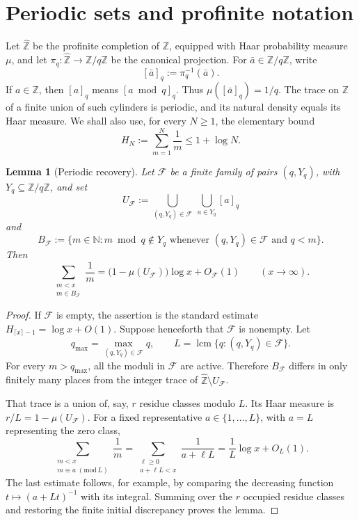 \documentclass[11pt]{article}
\numberwithin{equation}{section}
\newtheorem{lemma}[theorem]{Lemma}
\theoremstyle{definition}
\theoremstyle{remark}
\newcommand{\N}{\mathbb N}
\newcommand{\Z}{\mathbb Z}
\newcommand{\Zh}{\widehat{\mathbb Z}}
\begin{document}
\section{Periodic sets and profinite notation}\label{sec:periodic}
Let \(\Zh\) be the profinite completion of \(\Z\), equipped with Haar
probability measure \(\mu\), and let
\(\pi_q:\Zh\to\Z/q\Z\) be the canonical projection.  For
\(\bar a\in\Z/q\Z\), write
\[
 [\bar a]_q:=\pi_q^{-1}(\bar a).
\]
If \(a\in\Z\), then \([a]_q\) means \([a\bmod q]_q\).  Thus
\(\mu([\bar a]_q)=1/q\).  The trace on \(\Z\) of a finite union of such
cylinders is periodic, and its natural density equals its Haar measure.
We shall also use, for every \(N\ge1\), the elementary bound
\[
 H_N:=\sum_{m=1}^N\frac1m\le1+\log N.
\]

\begin{lemma}[Periodic recovery]\label{lem:periodic}
Let \(\mathcal F\) be a finite family of pairs \((q,Y_q)\), with
\(Y_q\subseteq\Z/q\Z\), and set
\[
 U_{\mathcal F}
 :=\bigcup_{(q,Y_q)\in\mathcal F}\ \bigcup_{a\in Y_q}[a]_q
\]
and
\[
 B_{\mathcal F}
 :=\{m\in\N:m\bmod q\notin Y_q
       \text{ whenever }(q,Y_q)\in\mathcal F\text{ and }q<m\}.
\]
Then
\[
 \sum_{\substack{m<x\\m\in B_{\mathcal F}}}\frac1m
 =\bigl(1-\mu(U_{\mathcal F})\bigr)\log x+O_{\mathcal F}(1)
 \qquad(x\to\infty).
\]
\end{lemma}

\begin{proof}
If \(\mathcal F\) is empty, the assertion is the standard estimate
\(H_{\lceil x\rceil-1}=\log x+O(1)\).  Suppose henceforth that
\(\mathcal F\) is nonempty.  Let
\[
 q_{\max}=\max_{(q,Y_q)\in\mathcal F}q,
 \qquad
 L=\operatorname{lcm}\{q:(q,Y_q)\in\mathcal F\}.
\]
For every \(m>q_{\max}\), all the moduli in \(\mathcal F\) are active.
Therefore \(B_{\mathcal F}\) differs in only finitely many places from the
integer trace of \(\Zh\setminus U_{\mathcal F}\).

That trace is a union of, say, \(r\) residue classes modulo \(L\).  Its
Haar measure is \(r/L=1-\mu(U_{\mathcal F})\).  For a fixed representative
\(a\in\{1,\ldots,L\}\), with \(a=L\) representing the zero class,
\[
 \sum_{\substack{m<x\\m\equiv a\;(\mathrm{mod}\,L)}}\frac1m
 =\sum_{\substack{\ell\ge0\\a+\ell L<x}}\frac1{a+\ell L}
 =\frac1L\log x+O_L(1).
\]
The last estimate follows, for example, by comparing the decreasing
function \(t\mapsto(a+Lt)^{-1}\) with its integral.  Summing over the
\(r\) occupied residue classes and restoring the finite initial
discrepancy proves the lemma.
\end{proof}
\end{document}
